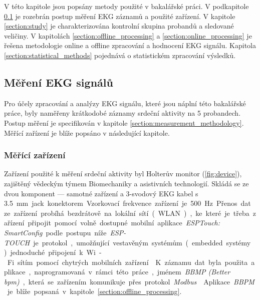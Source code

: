 V této kapitole jsou popsány metody použité v bakalářské práci. V podkapitole
\ref{section:measurement} je rozebrán postup měření EKG záznamů a použité
zařízení. V kapitole \ref{section:study} je charakterizována kontrolní skupina
probandů a sledované veličiny. V kapitolách \ref{section:offline_processing} a
\ref{section:online_processing} je řešena metodologie online a offline
zpracování a hodnocení EKG signálu. Kapitola \ref{section:statistical_methods}
pojednává o statistickém zpracování výsledků.

\subsection{Měření EKG signálů}
\label{section:measurement}
Pro účely zpracování a analýzy EKG signálu, které jsou náplní této bakalářské
práce, byly naměřeny krátkodobé záznamy srdeční aktivity na 5 probandech. Postup
měření je specifikován v kapitole \ref{section:measurement_methodology}. Měřící
zařízení je blíže popsáno v následující kapitole.

\subsubsection{Měřící zařízení}
\label{section:measurement_device}
Zařízení použité k měření srdeční aktivity byl Holterův monitor
(\ref{fig:device}), zajištěný vědeckým týmem Biomechaniky a asistivních
technologií. Skládá se ze dvou komponent --- samotné zařízení a 3-svodový EKG
kabel s 3.5~\si\mm~jack konektorem. Vzorkovací frekvence zařízení je 500 \si\Hz.

Přenos dat ze zařízení probíhá bezdrátově na lokální sítí (WLAN), ke které je
třeba zařízení připojit pomocí volně dostupné mobilní aplikace \textit{ESPTouch:
    SmartConfig} podle postupu níže. \textit{ESP-TOUCH} je protokol, umožňující
vestavěným systémům (embedded systémy) jednoduché připojení k Wi-Fi sítím pomocí
chytrých mobilních zařízení \cite{esptouch}. K záznamu dat byla použita
aplikace, naprogramovaná v rámci této práce, jménem \textit{BBMP (Better bpm)},
která se zařízením komunikuje přes protokol \textit{Modbus} \cite{modbus}.
Aplikace \textit{BBPM} je blíže popsaná v kapitole
\ref{section:offline_processing}.

